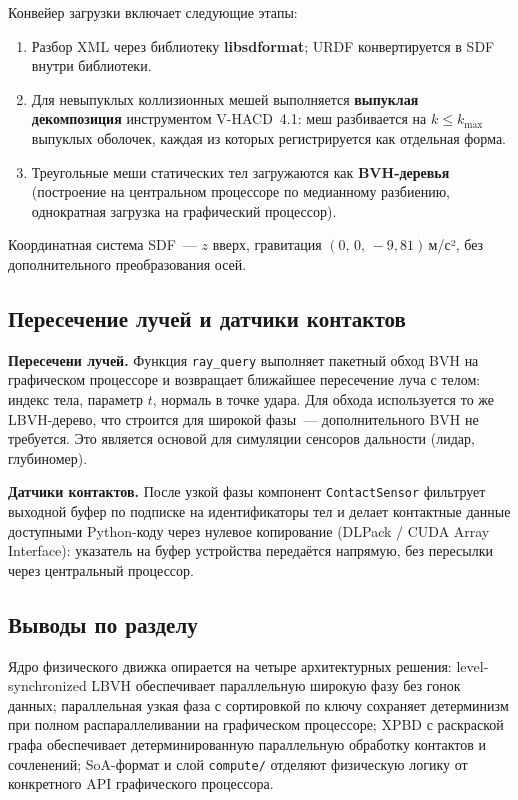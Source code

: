Конвейер загрузки включает следующие этапы:
\begin{enumerate}
  \item Разбор XML через библиотеку \textbf{libsdformat};
    URDF конвертируется в SDF внутри библиотеки.
  \item Для невыпуклых коллизионных мешей выполняется
    \textbf{выпуклая декомпозиция} инструментом V-HACD~4.1:
    меш разбивается на $k \leq k_{\max}$ выпуклых оболочек,
    каждая из которых регистрируется как отдельная форма.
  \item Треугольные меши статических тел загружаются как \textbf{BVH-деревья}
    (построение на центральном процессоре по медианному разбиению, однократная загрузка на графический процессор).
\end{enumerate}

Координатная система SDF~--- $z$ вверх, гравитация $(0,\,0,\,-9{,}81)$\,м/с²,
без дополнительного преобразования осей.

\subsection{Пересечение лучей и датчики контактов}
\label{sec:sensors}

\textbf{Пересечени лучей.} Функция \texttt{ray\_query} выполняет пакетный обход BVH на графическом процессоре и возвращает 
ближайшее пересечение луча с телом: индекс тела, параметр $t$, нормаль в точке удара. Для обхода используется 
то же LBVH-дерево, что строится для широкой фазы~--- дополнительного BVH не требуется. Это является основой 
для симуляции сенсоров дальности (лидар, глубиномер).

\textbf{Датчики контактов.} После узкой фазы компонент \texttt{Contact\-Sensor} 
фильтрует выходной буфер по подписке на идентификаторы тел и делает контактные данные доступными Python-коду 
через нулевое копирование (DLPack / CUDA Array Interface): указатель на буфер устройства передаётся напрямую, 
без пересылки через центральный процессор.

\subsection{Выводы по разделу}

Ядро физического движка опирается на четыре архитектурных решения: level-synchronized LBVH обеспечивает 
параллельную широкую фазу без гонок данных; параллельная узкая фаза с сортировкой по ключу сохраняет 
детерминизм при полном распараллеливании на графическом процессоре; XPBD с раскраской графа обеспечивает 
детерминированную параллельную обработку контактов и сочленений; SoA-формат и слой \texttt{compute/} отделяют 
физическую логику от конкретного API графического процессора.
